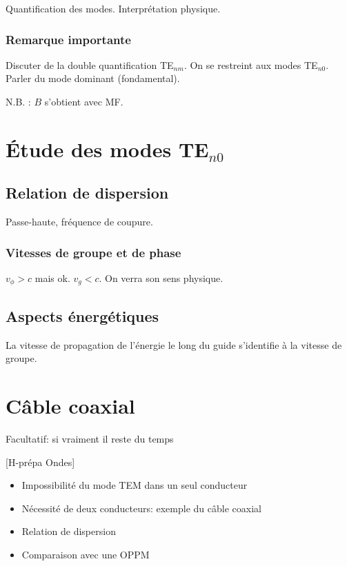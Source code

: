 \documentclass[11pt]{report}
\numberwithin{figure}{section}
\numberwithin{equation}{section}
\numberwithin{table}{section}
\newcommand{\1}{\boldsymbol{1}}
\begin{document}
Quantification des modes. Interprétation physique.

\subsubsection*{Remarque importante}

Discuter de la double quantification TE$_{nm}$. On se restreint aux modes TE$_{n0}$. Parler du mode dominant (fondamental).

N.B. : $B$ s'obtient avec MF.

\section{Étude des modes TE$_{n0}$}

\subsection{Relation de dispersion}

Passe-haute, fréquence de coupure.

\subsubsection{Vitesses de groupe et de phase}

$v_\phi > c$ mais ok. $v_g < c$. On verra son sens physique.

\subsection{Aspects énergétiques}

La vitesse de propagation de l'énergie le long du guide s'identifie à la vitesse de groupe.


\section{Câble coaxial}

\textcolor{mycolor5}{Facultatif: si vraiment il reste du temps}

[H-prépa Ondes]

\begin{itemize}
\item Impossibilité du mode TEM dans un seul conducteur
\item Nécessité de deux conducteurs: exemple du câble coaxial
\item Relation de dispersion
\item Comparaison avec une OPPM
\end{itemize}
\end{document}
